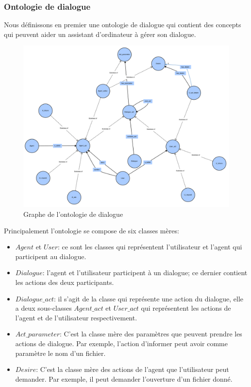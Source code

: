 \subsubsection{Ontologie de dialogue}\label{onto1}
Nous définissons en premier une ontologie de dialogue qui contient des concepts qui peuvent aider un assistant d'ordinateur à gérer son dialogue.
\begin{figure}[H] 
	
	\centering
	\includegraphics[width=1.1\linewidth]{images/Conception/DM/main_onto.png}
	\caption{Graphe de l'ontologie de dialogue}
\end{figure}\label{mail_onto}
Principalement l'ontologie se compose de six classes mères:
\begin{itemize}
	\item $Agent$ et $User$: ce sont les classes qui représentent l'utilisateur et l'agent qui participent au dialogue.
	\item $Dialogue$: l'agent et l'utilisateur participent à un dialogue; ce dernier contient les actions des deux participants.
	\item $Dialogue\_act$: il s'agit de la classe qui représente une action du dialogue, elle a deux sous-classes $Agent\_act$ et $User\_act$ qui représentent les actions de l'agent et de l'utilisateur respectivement.
	\item $Act\_parameter$: C'est la classe mère des paramètres que peuvent prendre les actions de dialogue. Par exemple, l'action d'informer peut avoir comme paramètre le nom d'un fichier.
	\item $Desire$: C'est la classe mère des actions de l'agent que l'utilisateur peut demander. Par exemple, il peut demander l'ouverture d'un fichier donné.
\end{itemize}
